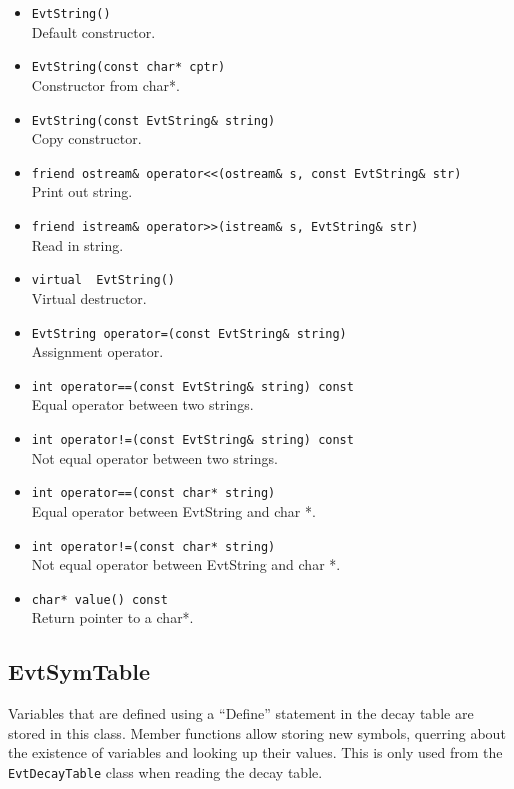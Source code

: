 \begin{itemize}
\item {\tt EvtString()}\\ 
      Default constructor.
\item {\tt EvtString(const char* cptr)}\\ 
      Constructor from char*.
\item {\tt EvtString(const EvtString\& string)}\\
      Copy constructor. 
\item {\tt friend ostream\& operator<<(ostream\& s, const EvtString\& str)  }\\
      Print out string. 
\item {\tt friend istream\& operator>>(istream\& s, EvtString\& str)}\\ 
      Read in string.
\item {\tt virtual ~EvtString()}\\
      Virtual destructor. 
\item {\tt EvtString operator=(const EvtString\& string)}\\ 
      Assignment operator. 
\item {\tt int operator==(const EvtString\& string) const}\\ 
      Equal operator between two strings.
\item {\tt int operator!=(const EvtString\& string) const}\\
      Not equal operator between two strings. 
\item {\tt int operator==(const char* string)}\\
      Equal operator between EvtString and char *. 
\item {\tt int operator!=(const char* string)}\\ 
      Not equal operator between EvtString and char *. 
\item {\tt char* value() const}\\ 
      Return pointer to a char*.
\end{itemize}

\subsection{EvtSymTable}

Variables that are defined using a ``Define'' statement in the 
decay table are stored in this class. Member functions allow 
storing new symbols, querring about the existence of variables
and looking up their values. This is only used from the 
{\tt EvtDecayTable} class when reading the decay table.


